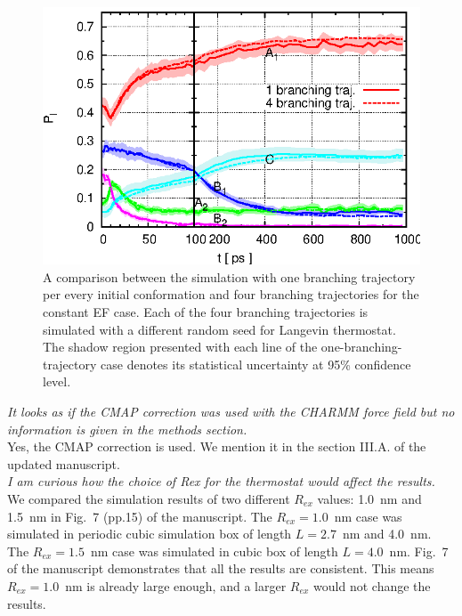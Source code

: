 \documentclass[]{revtex4-1}
\begin{document}
\begin{figure}
  \centering
  \includegraphics{figs/fig-meta-more.eps}
  \caption{A comparison between the simulation with one branching
    trajectory per every initial conformation and four branching
    trajectories  for the
    constant EF case. Each of the four
    branching trajectories is simulated with a different random seed for
    Langevin thermostat.
    The shadow region presented with each line of the one-branching-trajectory case
    denotes its statistical uncertainty at 95\% confidence level.  }
  \label{fig:tmp2}
\end{figure}

\emph{ It looks as if the CMAP correction was used with the CHARMM
  force field but no information is given in the methods section.}\\

Yes, the CMAP correction is used. We mention it in the
section III.A. of the updated manuscript.
\\

\emph{
I am curious how the choice of Rex for the thermostat would affect the
results.
}\\

We compared the simulation results of two different $R_{ex}$ values:
1.0~nm and 1.5~nm in Fig.~7 (pp.15) of the manuscript. The
$R_{ex}=1.0$~nm case was simulated in periodic cubic simulation box
of length $L=2.7$~nm and 4.0~nm.  The $R_{ex}=1.5$~nm case was
simulated in cubic box of length $L=4.0$~nm. Fig.~7 of the
manuscript demonstrates that all the results are consistent. This
means $R_{ex}=1.0$~nm is already large enough, and a larger $R_{ex}$
would not change the results.\\
\end{document}
